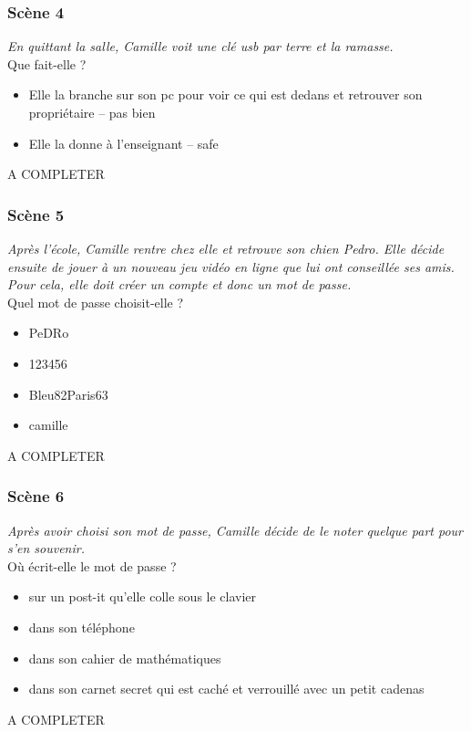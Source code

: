 \documentclass[a4paper]{article}
\begin{document}
    \subsubsection{Scène 4}
    
        \textit{En quittant la salle, Camille voit une clé usb par terre et la ramasse.} \\
        
        Que fait-elle ?
        \begin{itemize}
            \item Elle la branche sur son pc pour voir ce qui est dedans et retrouver son propriétaire -- pas bien
            \item Elle la donne à l'enseignant --  safe
        \end{itemize}
            A COMPLETER
        
    \subsubsection{Scène 5}
        \textit{Après l'école, Camille rentre chez elle et retrouve son chien Pedro. Elle décide ensuite de jouer à un nouveau jeu vidéo en ligne que lui ont conseillée ses amis. Pour cela, elle doit créer un compte et donc un mot de passe.} \\
        
        Quel mot de passe choisit-elle ?
        \begin{itemize}
            \item PeDRo
            \item 123456
            \item Bleu82Paris63
            \item camille
        \end{itemize}
            A COMPLETER
            
    \subsubsection{Scène 6}
        \textit{Après avoir choisi son mot de passe, Camille décide de le noter quelque part pour s'en souvenir.} \\
        
        Où écrit-elle le mot de passe ?
        \begin{itemize}
            \item sur un post-it qu'elle colle sous le clavier
            \item dans son téléphone
            \item dans son cahier de mathématiques
            \item dans son carnet secret qui est caché et verrouillé avec un petit cadenas
        \end{itemize}
            A COMPLETER
            
\end{document}
